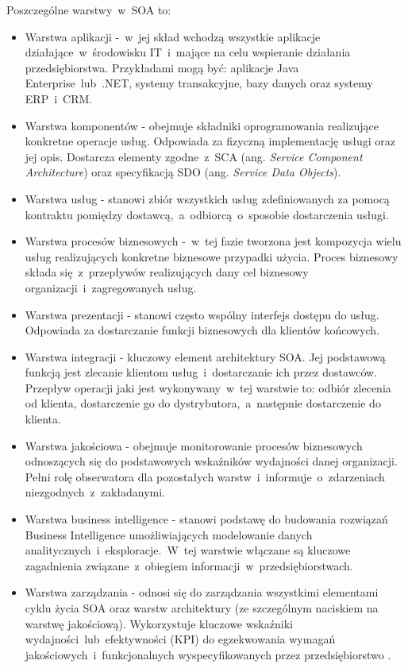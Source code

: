 Poszczególne warstwy~w~SOA to:
\begin{itemize}
\item{Warstwa aplikacji -~w~jej skład wchodzą wszystkie aplikacje działające~w~środowisku IT~i~mające na celu wspieranie działania przedsiębiorstwa. Przykładami mogą być: aplikacje Java Enterprise~lub~.NET, systemy transakcyjne, bazy danych oraz systemy ERP~i~CRM.}
\item{Warstwa komponentów - obejmuje składniki oprogramowania realizujące konkretne operacje usług. Odpowiada za fizyczną implementację usługi oraz jej opis. Dostarcza elementy zgodne~z~SCA (ang. \textit{Service Component Architecture}) oraz specyfikacją SDO (ang. \textit{Service Data Objects}).}
\item{Warstwa usług - stanowi zbiór wszystkich usług zdefiniowanych za pomocą kontraktu pomiędzy dostawcą,~a~odbiorcą~o~sposobie dostarczenia usługi.}
\item{Warstwa procesów biznesowych -~w~tej fazie tworzona jest kompozycja wielu usług realizujących konkretne biznesowe przypadki użycia. Proces biznesowy składa się~z~przepływów realizujących dany cel biznesowy organizacji~i~zagregowanych usług.}
\item{Warstwa prezentacji - stanowi często wspólny interfejs dostępu do usług. Odpowiada za dostarczanie funkcji biznesowych dla klientów końcowych.}
\item{Warstwa integracji - kluczowy element architektury SOA. Jej podstawową funkcją jest zlecanie klientom usług~i~dostarczanie ich przez dostawców. Przepływ operacji jaki jest wykonywany~w~tej warstwie to: odbiór zlecenia od klienta, dostarczenie go do dystrybutora,~a~następnie dostarczenie do klienta.}
\item{Warstwa jakościowa - obejmuje monitorowanie procesów biznesowych odnoszących się do podstawowych wskaźników wydajności danej organizacji. Pełni rolę obserwatora dla pozostałych warstw~i~informuje~o~zdarzeniach niezgodnych~z~zakładanymi.}
\item{Warstwa business intelligence - stanowi podstawę do budowania rozwiązań Business Intelligence umożliwiających modelowanie danych analitycznych~i~eksploracje.~W~tej warstwie włączane są kluczowe zagadnienia związane~z~obiegiem informacji~w~przedsiębiorstwach.}
\item{Warstwa zarządzania - odnosi się do zarządzania wszystkimi elementami cyklu życia SOA oraz warstw architektury (ze szczególnym naciskiem na warstwę jakościową). Wykorzystuje kluczowe wskaźniki wydajności~lub~efektywności (KPI) do egzekwowania wymagań jakościowych~i~funkcjonalnych wyspecyfikowanych przez przedsiębiorstwo \cite{PlatIntGor}.}
\end{itemize}

